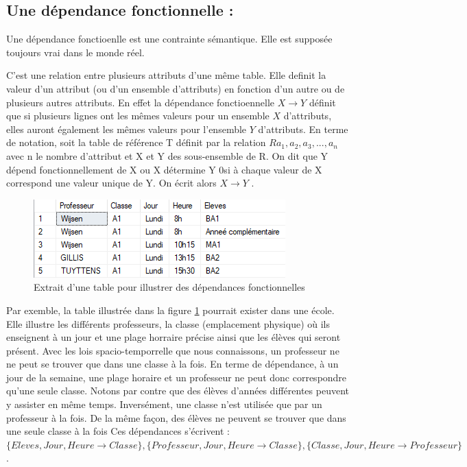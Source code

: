 \documentclass[12pt, a4paper, oneside, titlepage]{book}%
\begin{document}
\subsection{Une dépendance fonctionnelle : }
Une dépendance fonctioenlle est une contrainte sémantique. Elle est supposée toujours vrai dans le monde réel.

C'est une relation entre plusieurs attributs d'une même table. Elle definit la valeur d'un attribut (ou d'un ensemble d'attributs) en fonction d'un autre ou de plusieurs autres attributs. En effet la dépendance fonctioennelle $ X \rightarrow Y$ définit que si plusieurs lignes ont les mêmes valeurs pour un ensemble $X$ d'attributs, elles auront également les mêmes valeurs pour l'ensemble $Y$ d'attributs.
En terme de notation, soit la table de référence T définit par la relation $R{a_1, a_2, a_3,...,a_n}$ avec n le nombre d'attribut et X et Y des sous-ensemble de R. On dit que \fg Y dépend fonctionnellement de X \og ou \fg X détermine Y \og 0si à chaque valeur de X correspond une valeur unique de Y. On écrit alors \fg $ X \rightarrow Y$ \og.

\begin{figure}[ht]
	\center
	\includegraphics{DF.png}
	\caption{\label{picDF} Extrait d'une table pour illustrer des dépendances fonctionnelles}
\end{figure}

Par exemble, la table illustrée dans la figure \ref{picDF} pourrait exister dans une école. Elle illustre les différents professeurs, la classe (emplacement physique) où ils enseignent à un jour et une plage horraire précise ainsi que les élèves qui seront présent. Avec les lois spacio-temporrelle que nous connaissons, un professeur ne ne peut se trouver que dans une classe à la fois. En terme de dépendance, à un jour de la semaine, une plage horaire et un professeur ne peut donc correspondre qu'une seule classe. Notons par contre que des élèves d'années différentes peuvent y assister en même temps. Inversément, une classe n'est utilisée que par un professeur à la fois. De la même façon, des élèves ne peuvent se trouver que dans une seule classe à la fois
Ces dépendances s'écrivent : $\{Eleves, Jour, Heure \rightarrow Classe\}, \{Professeur, Jour, Heure \rightarrow Classe\}, \{Classe, Jour, Heure \rightarrow Professeur\}$.
\end{document}
